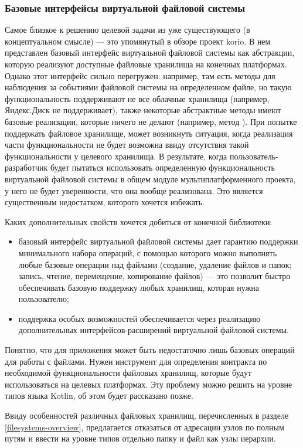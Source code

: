   \subsubsection{Базовые интерфейсы виртуальной файловой системы}
    Самое близкое к решению целевой задачи из уже существующего (в концептуальном смысле) --- это упомянутый в обзоре проект korio\cite{gh-korio}. В нем представлен базовый интерфейс виртуальной файловой системы как абстракции, которую реализуют доступные файловые хранилища на конечных платформах. Однако этот интерфейс сильно перегружен: например, там есть методы для наблюдения за событиями файловой системы на определенном файле, но такую функциональность поддерживают не все облачные хранилища (например, Яндекс.Диск не поддерживает), также некоторые абстрактные методы имеют базовые реализации, которые ничего не делают (например, метод ). При попытке поддержать файловое хранилище, может возникнуть ситуация, когда реализация части функциональности не будет возможна ввиду отсутствия такой функциональности у целевого хранилища. В результате, когда пользователь-разработчик будет пытаться использовать определенную функциональность виртуальной файловой системы в общем модуле мультиплатформенного проекта, у него не будет уверенности, что она вообще реализована. Это является существенным недостатком, которого хочется избежать.

    Каких дополнительных свойств хочется добиться от конечной библиотеки: 
    \begin{itemize}
    \item базовый интерфейс виртуальной файловой системы дает гарантию поддержки минимального набора операций, с помощью которого можно выполнять любые базовые операции над файлами (создание, удаление файлов и папок; запись, чтение, перемещение, копирование файлов) --- это позволит быстро обеспечивать базовую поддержку любых хранилищ, которая нужна пользователю;
    \item поддержка особых возможностей обеспечивается через реализацию дополнительных интерфейсов-расширений виртуальной файловой системы.
    \end{itemize}
    Понятно, что для приложения может быть недостаточно лишь базовых операций для работы с файлами. Нужен инструмент для определения контракта по необходимой функциональности файловых хранилищ, которые будут использоваться на целевых платформах. Эту проблему можно решить на уровне типов языка Kotlin, об этом будет рассказано позже.

    Ввиду особенностей различных файловых хранилищ, перечисленных в разделе \ref{filesystems-overview}, предлагается отказаться от адресации узлов по полным путям и ввести на уровне типов отдельно папку и файл как узлы иерархии.

